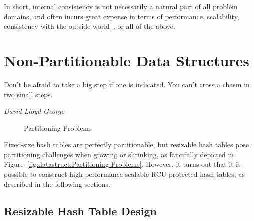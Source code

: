 In short, internal consistency is not necessarily a natural part of all
problem domains, and often incurs great expense in terms of performance,
scalability, consistency with the outside
world~\cite{AndreasHaas2012FIFOisnt,AndreasHaas2013CFRelaxedQueues,10.5555/3241639.3241645},
or all of the above.

\section{Non-Partitionable Data Structures}
\label{sec:datastruct:Non-Partitionable Data Structures}
%
\epigraph{Don't be afraid to take a big step if one is indicated.
	  You can't cross a chasm in two small steps.}
	 {\emph{David Lloyd George}}

\begin{figure}[tb]
\centering
{}
\caption{Partitioning Problems}
\end{figure}

Fixed-size hash tables are perfectly partitionable, but resizable hash
tables pose partitioning challenges when growing or shrinking, as
fancifully depicted in
Figure~\ref{fig:datastruct:Partitioning Problems}.
However, it turns out that it is possible to construct high-performance
scalable RCU-protected hash tables, as described in the following sections.

\subsection{Resizable Hash Table Design}
\label{sec:datastruct:Resizable Hash Table Design}

